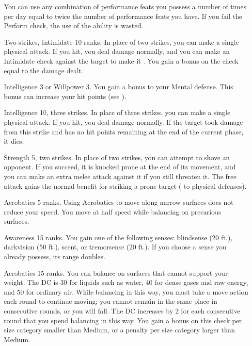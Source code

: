 You can use any combination of performance feats you possess a number of times per day equal to twice the number of performance feats you have.
If you fail the Perform check, the use of the ability is wasted.

\featpres Two strikes, Intimidate 10 ranks.
\featben In place of two strikes, you can make a single physical attack.
If you hit, you deal damage normally, and you can make an Intimidate check against the target to make it \shaken.
You gain a bonus on the check equal to the damage dealt.

\featpre Intelligence 3 or Willpower 3.
\featben You gain a  bonus to your Mental defense.
This bonus can increase your hit points (see ).

\featpre Intelligence 10, three strikes.
\featben In place of three strikes, you can make a single physical attack.
If you hit, you deal damage normally.
If the target took damage from this strike and has no hit points remaining at the end of the current phase, it dies.

\featpre Strength 5, two strikes.
\featben In place of two strikes, you can attempt to shove an opponent.
If you succeed, it is knocked prone at the end of its movement, and you can make an extra melee attack against it if you still threaten it.
The free attack gains the normal benefit for striking a prone target ( to physical defenses).

\featpre Acrobatics 5 ranks.
\featben Using Acrobatics to move along narrow surfaces does not reduce your speed.
You move at half speed while balancing on precarious surfaces.

\featpre Awareness 15 ranks.
\featben You gain one of the following senses: blindsense (20 ft.), darkvision (50 ft.), scent, or tremorsense (20 ft.).
If you choose a sense you already possess, its range doubles.

\featpre Acrobatics 15 ranks.
\featben You can balance on surfaces that cannot support your weight.
The DC is 30 for liquids such as water, 40 for dense gases and raw energy, and 50 for ordinary air.
While balancing in this way, you must take a move action each round to continue moving; you cannot remain in the same place in consecutive rounds, or you will fall.
The DC increases by 2 for each consecutive round that you spend balancing in this way.
You gain a  bonus on this check per size category smaller than Medium, or a  penalty per size category larger than Medium.

